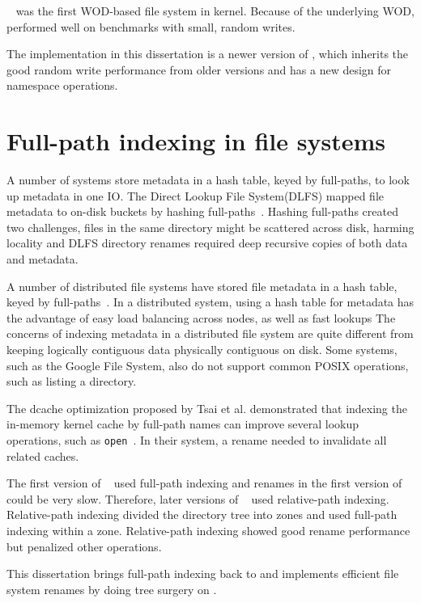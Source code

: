 \betrfs~\cite{betrfs1,betrfs1tos,betrfs2,betrfs2tos,betrfs3} was the first
WOD-based file system in kernel.
Because of the underlying WOD, \betrfs performed well on benchmarks
with small, random writes.

The implementation in this dissertation is a newer version of \betrfs,
which inherits the good random write performance from older versions and
has a new design for namespace operations.

\section{Full-path indexing in file systems}
A number of systems store metadata in a hash table,
keyed by full-paths, to look up metadata in one IO.
The Direct Lookup File System(DLFS) mapped file metadata to on-disk buckets by
hashing full-paths~\citep{dlfs}.
Hashing full-paths created two challenges, files in the same directory might be
scattered across disk, harming locality and DLFS directory renames required deep
recursive copies of both data and metadata.

A number of distributed file systems have stored file metadata in a hash table,
keyed by full-paths~\citep{gfs,nsidw,rdfs}.
In a distributed system, using a hash table for metadata has the advantage of
easy load balancing across nodes, as well as fast lookups
The concerns of indexing metadata in a distributed file system are quite
different from keeping logically contiguous data physically contiguous on disk.
Some systems, such as the Google File System, also do not support common POSIX
operations, such as listing a directory.

The dcache optimization proposed by Tsai et al. demonstrated that
indexing the in-memory kernel cache by full-path names can improve several
lookup operations, such as \texttt{open}~\citep{dcache}.
In their system, a rename needed to invalidate all related caches.

The first version of \betrfs~\cite{betrfs1,betrfs1tos} used full-path indexing
and renames in the first version of \betrfs could be very slow.
Therefore, later versions of \betrfs~\cite{betrfs2,betrfs2tos,betrfs3} used
relative-path indexing.
Relative-path indexing divided the directory tree into zones and used
full-path indexing within a zone.
Relative-path indexing showed good rename performance but penalized other
operations.

This dissertation brings full-path indexing back to \betrfs
and implements efficient file system renames by doing tree surgery on \bets.

